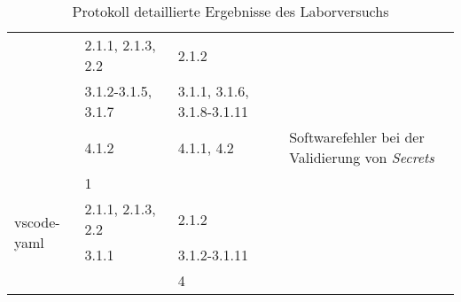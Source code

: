 \begin{table}[htp]
\begin{tabularx}{\columnwidth}{lXXl}
                                                                                  & 2.1.1, 2.1.3, 2.2                                                           & 2.1.2                                                                                       &                                                         \\
                                                                                  & 3.1.2{-}3.1.5, 3.1.7                                                        & 3.1.1, 3.1.6, 3.1.8{-}3.1.11                                                                &                                                         \\
                                                                                  & 4.1.2                                                                       & 4.1.1, 4.2                                                                                  & Softwarefehler bei der Validierung von \textit{Secrets} \\
    \midrule
    \multirow{4}{*}{vscode-yaml}                                                  & 1                                                                           &                                                                                             &                                                         \\
                                                                                  & 2.1.1, 2.1.3, 2.2                                                           & 2.1.2                                                                                       &                                                         \\
                                                                                  & 3.1.1                                                                       & 3.1.2{-}3.1.11                                                                              &                                                         \\
                                                                                  &                                                                             & 4                                                                                           &                                                         \\
    \bottomrule
  \end{tabularx}
  \caption{Protokoll detaillierte Ergebnisse des Laborversuchs}
  \label{tbl:test-cases-experiment}
\end{table}


